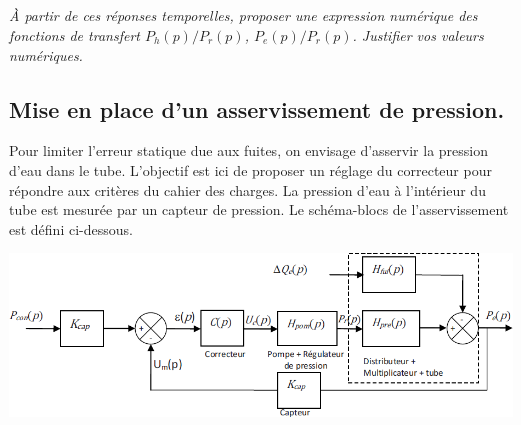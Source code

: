\documentclass[10pt,fleqn]{article} %
\begin{document}
\begin{multicols}{2}
\subparagraph{}
\textit{À partir de ces réponses temporelles, proposer une expression numérique des fonctions de transfert $P_h(p)/P_r(p)$, $P_e(p)/P_r(p)$. Justifier vos valeurs numériques.}
%
%
%
%

\subsection*{Mise en place d'un asservissement de pression.}
Pour limiter l’erreur statique due aux fuites, on envisage d’asservir la pression d’eau dans le tube. L’objectif est ici de proposer un réglage du correcteur pour répondre aux critères du cahier des charges.
La pression d’eau à l’intérieur du tube est mesurée par un capteur de pression. Le schéma-blocs de l’asservissement est défini ci-dessous.

\begin{center}
\includegraphics[width=\linewidth]{images_02/fig_06}
\end{center}


\end{multicols}
\end{document}
